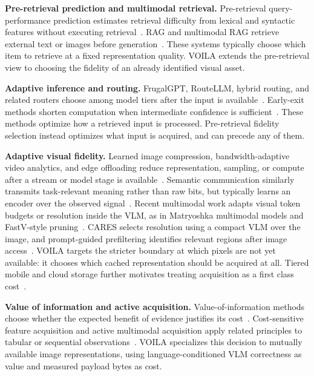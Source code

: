 \documentclass[10pt,conference]{IEEEtran}
\newcommand{\system}{\textsc{VOILA}\xspace}
\begin{document}
\textbf{Pre-retrieval prediction and multimodal retrieval.}
Pre-retrieval query-performance prediction estimates retrieval difficulty from
lexical and syntactic features without executing retrieval~\cite{
zhao2008predicting,hauff2008improved,mothe2005linguistic}. RAG and multimodal
RAG retrieve external text or images before generation~\cite{lewis2020rag,
yasunaga2023retrievalaugmented,chen2022murag}. These systems typically choose
which item to retrieve at a fixed representation quality. \system extends the
pre-retrieval view to choosing the fidelity of an already identified visual
asset.

\textbf{Adaptive inference and routing.}
FrugalGPT, RouteLLM, hybrid routing, and related routers choose among model
tiers after the input is available~\cite{chen2023frugalgpt,wang2024routellm,
ding2024hybrid,shnitzer2023large}. Early-exit methods shorten computation when
intermediate confidence is sufficient~\cite{zhou2020bert,elbayad2020depth,
schuster2022confident}. These methods optimize how a retrieved input is
processed. Pre-retrieval fidelity selection instead optimizes what input is
acquired, and can precede any of them.

\textbf{Adaptive visual fidelity.}
Learned image compression, bandwidth-adaptive video analytics, and edge
offloading reduce representation, sampling, or compute after a stream or model
stage is available~\cite{toderici2016variablerateimagecompression,
jiang2018chameleon,du2020dds,li2020reducto,kang2017neurosurgeon,
chu2024mobilevlm,farazi2021accuracy,weng2024learning}. Semantic communication
similarly transmits task-relevant meaning rather than raw bits, but typically
learns an encoder over the observed signal~\cite{xie2021semantic}. Recent
multimodal work adapts visual token budgets or resolution inside the VLM, as in
Matryoshka multimodal models and FastV-style pruning~\cite{
cai2024matryoshka,chen2024fastv}. CARES selects resolution using a compact VLM
over the image, and prompt-guided prefiltering identifies relevant regions after
image access~\cite{kimhi2025cares,azizian2026promptguided}. \system targets the
stricter boundary at which pixels are not yet available: it chooses which
cached representation should be acquired at all. Tiered mobile and cloud storage
further motivates treating acquisition as a first class cost~\cite{
lonn2019smartphonepictureorganizationhierarchical,aws_s3_storage_classes,
hort2021survey}.

\textbf{Value of information and active acquisition.}
Value-of-information methods choose whether the expected benefit of evidence
justifies its cost~\cite{bilgic2011value}. Cost-sensitive feature acquisition
and active multimodal acquisition apply related principles to tabular or
sequential observations~\cite{karkkainen2019cost,kossen2022active}. \system
specializes this decision to mutually available image representations, using
language-conditioned VLM correctness as value and measured payload bytes as
cost.
\end{document}
